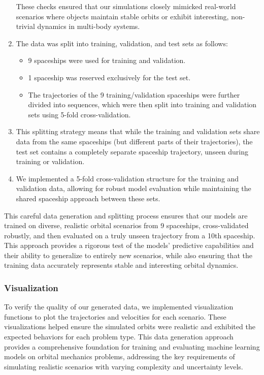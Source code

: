 \documentclass[12pt,a4paper]{article}
\begin{document}
\begin{enumerate}
    These checks ensured that our simulations closely mimicked real-world scenarios where objects maintain stable orbits or exhibit interesting, non-trivial dynamics in multi-body systems.
    \item The data was split into training, validation, and test sets as follows:
    \begin{itemize}
        \item 9 spaceships were used for training and validation.
        \item 1 spaceship was reserved exclusively for the test set.
        \item The trajectories of the 9 training/validation spaceships were further divided into sequences, which were then split into training and validation sets using 5-fold cross-validation.
    \end{itemize}
    \item This splitting strategy means that while the training and validation sets share data from the same spaceships (but different parts of their trajectories), the test set contains a completely separate spaceship trajectory, unseen during training or validation.
    \item We implemented a 5-fold cross-validation structure for the training and validation data, allowing for robust model evaluation while maintaining the shared spaceship approach between these sets.
\end{enumerate}

This careful data generation and splitting process ensures that our models are trained on diverse, realistic orbital scenarios from 9 spaceships, cross-validated robustly, and then evaluated on a truly unseen trajectory from a 10th spaceship. This approach provides a rigorous test of the models' predictive capabilities and their ability to generalize to entirely new scenarios, while also ensuring that the training data accurately represents stable and interesting orbital dynamics.
\subsubsection{Visualization}
To verify the quality of our generated data, we implemented visualization functions to plot the trajectories and velocities for each scenario. These visualizations helped ensure the simulated orbits were realistic and exhibited the expected behaviors for each problem type.
This data generation approach provides a comprehensive foundation for training and evaluating machine learning models on orbital mechanics problems, addressing the key requirements of simulating realistic scenarios with varying complexity and uncertainty levels.
\end{document}
